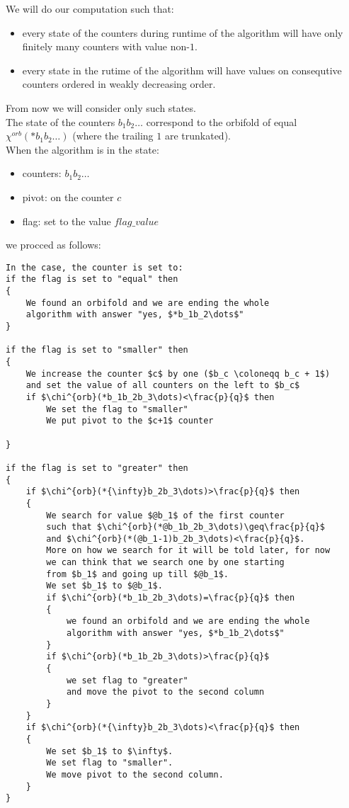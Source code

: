 We will do our computation such that:
\begin{itemize}
\item every state of the counters during runtime of the algorithm will have only finitely many 
counters with value non-$1$. 
\item every state in the rutime of the algorithm 
will have values on consequtive counters ordered in weakly decreasing order.
\end{itemize}
From now we will 
consider only such states. \\
The state of the counters $b_1b_2\dots$ correspond to the orbifold of 
\Eoc  equal $\chi^{orb}(*b_1b_2\dots)$ (where the trailing $1$ are trunkated). \\ 
When the algorithm is in the state: 
\begin{itemize}
\item counters: $b_1b_2\dots$
\item pivot: on the counter $c$
\item flag: set to the value $flag\_value$
\end{itemize}
we procced as follows:
\begin{lstlisting}[firstnumber=1,consecutivenumbers=true]
In the case, the counter is set to:
if the flag is set to "equal" then 
{
    We found an orbifold and we are ending the whole
    algorithm with answer "yes, $*b_1b_2\dots$"
}

if the flag is set to "smaller" then 
{
    We increase the counter $c$ by one ($b_c \coloneqq b_c + 1$)
    and set the value of all counters on the left to $b_c$
    if $\chi^{orb}(*b_1b_2b_3\dots)<\frac{p}{q}$ then
        We set the flag to "smaller"
        We put pivot to the $c+1$ counter
        
}

if the flag is set to "greater" then
{
    if $\chi^{orb}(*{\infty}b_2b_3\dots)>\frac{p}{q}$ then
    {
        We search for value $@b_1$ of the first counter 
        such that $\chi^{orb}(*@b_1b_2b_3\dots)\geq\frac{p}{q}$ 
        and $\chi^{orb}(*(@b_1-1)b_2b_3\dots)<\frac{p}{q}$.
        More on how we search for it will be told later, for now  
        we can think that we search one by one starting 
        from $b_1$ and going up till $@b_1$.
        We set $b_1$ to $@b_1$.
        if $\chi^{orb}(*b_1b_2b_3\dots)=\frac{p}{q}$ then 
        {
            we found an orbifold and we are ending the whole
            algorithm with answer "yes, $*b_1b_2\dots$"
        }
        if $\chi^{orb}(*b_1b_2b_3\dots)>\frac{p}{q}$
        {
            we set flag to "greater" 
            and move the pivot to the second column
        }
    }
    if $\chi^{orb}(*{\infty}b_2b_3\dots)<\frac{p}{q}$ then
    {
        We set $b_1$ to $\infty$.
        We set flag to "smaller".
        We move pivot to the second column.
    }    
}

\end{lstlisting}
